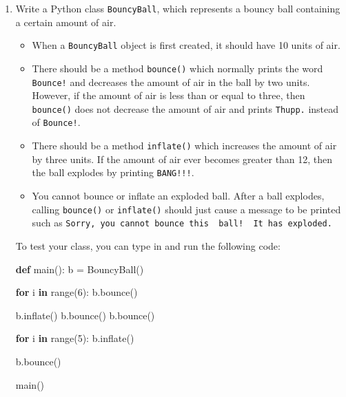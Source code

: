 \documentclass[]{article}
\newenvironment{Shaded}{}{}
\newcommand{\BuiltInTok}[1]{#1}
\newcommand{\ControlFlowTok}[1]{\textcolor[rgb]{0.00,0.44,0.13}{\textbf{#1}}}
\newcommand{\DecValTok}[1]{\textcolor[rgb]{0.25,0.63,0.44}{#1}}
\newcommand{\KeywordTok}[1]{\textcolor[rgb]{0.00,0.44,0.13}{\textbf{#1}}}
\newcommand{\NormalTok}[1]{#1}
\newcommand{\OperatorTok}[1]{\textcolor[rgb]{0.40,0.40,0.40}{#1}}
\providecommand{\tightlist}{%
  \setlength{\itemsep}{0pt}\setlength{\parskip}{0pt}}
\begin{document}
\begin{enumerate}
\def\labelenumi{\arabic{enumi}.}
\item
  Write a Python class \texttt{BouncyBall}, which represents a bouncy
  ball containing a certain amount of air.

  \begin{itemize}
  \tightlist
  \item
    When a \texttt{BouncyBall} object is first created, it should have
    10 units of air.
  \item
    There should be a method \texttt{bounce()} which normally prints the
    word \texttt{Bounce!} and decreases the amount of air in the ball by
    two units. However, if the amount of air is less than or equal to
    three, then \texttt{bounce()} does not decrease the amount of air
    and prints \texttt{Thupp.} instead of \texttt{Bounce!}.
  \item
    There should be a method \texttt{inflate()} which increases the
    amount of air by three units. If the amount of air ever becomes
    greater than 12, then the ball explodes by printing
    \texttt{BANG!!!}.
  \item
    You cannot bounce or inflate an exploded ball. After a ball
    explodes, calling \texttt{bounce()} or \texttt{inflate()} should
    just cause a message to be printed such as
    \texttt{Sorry,\ you\ cannot\ bounce\ this\ \ ball!\ \ It\ has\ exploded.}
  \end{itemize}

  To test your class, you can type in and run the following code:

\begin{Shaded}
\begin{Highlighting}[]
\KeywordTok{def}\NormalTok{ main():}
\NormalTok{    b }\OperatorTok{=}\NormalTok{ BouncyBall()}

    \ControlFlowTok{for}\NormalTok{ i }\KeywordTok{in} \BuiltInTok{range}\NormalTok{(}\DecValTok{6}\NormalTok{):}
\NormalTok{        b.bounce()}

\NormalTok{    b.inflate()}
\NormalTok{    b.bounce()}
\NormalTok{    b.bounce()}

    \ControlFlowTok{for}\NormalTok{ i }\KeywordTok{in} \BuiltInTok{range}\NormalTok{(}\DecValTok{5}\NormalTok{):}
\NormalTok{        b.inflate()}

\NormalTok{    b.bounce()}

\NormalTok{main()}
\end{Highlighting}
\end{Shaded}


\end{enumerate}
\end{document}
